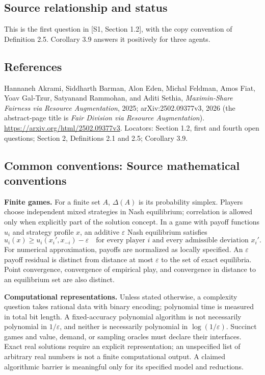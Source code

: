 \documentclass[11pt,a4paper]{article}
\begin{document}
\subsection*{Source relationship and status}
This is the first question in [S1, Section 1.2], with the copy convention
of Definition 2.5. Corollary 3.9 answers it positively for three agents.

\subsection*{References}
\begingroup\footnotesize\raggedright
\noindent[S1] Hannaneh Akrami, Siddharth Barman, Alon Eden,
Michal Feldman, Amos Fiat, Yoav Gal-Tzur, Satyanand Rammohan, and
Aditi Sethia,
\emph{Maximin-Share Fairness via Resource Augmentation},
2025; arXiv:2502.09377v3, 2026
(the abstract-page title is \emph{Fair Division via Resource Augmentation}).
\url{https://arxiv.org/html/2502.09377v3}.
Locators: Section 1.2, first and fourth open questions;
Section 2, Definitions 2.1 and 2.5; Corollary 3.9.
\par\endgroup

\subsection*{Common conventions: Source mathematical conventions}

\textbf{Finite games.} For a finite set $A$, $\Delta(A)$ is its probability
simplex. Players choose independent mixed strategies in Nash equilibrium;
correlation is allowed only when explicitly part of the solution concept.
In a game with payoff functions $u_i$ and strategy profile $x$, an additive
$\varepsilon$ Nash equilibrium satisfies
\[
 u_i(x)\geq u_i(x_i',x_{-i})-\varepsilon
 \quad\text{for every player $i$ and every admissible deviation $x_i'$}.
\]
For numerical approximation, payoffs are normalized as locally specified.
An $\varepsilon$ payoff residual is distinct from distance at most
$\varepsilon$ to the set of exact equilibria. Point convergence, convergence
of empirical play, and convergence in distance to an equilibrium set are
also distinct.

\textbf{Computational representations.} Unless stated otherwise, a complexity
question takes rational data with binary encoding; polynomial time is measured
in total bit length. A fixed-accuracy polynomial algorithm is not necessarily
polynomial in $1/\varepsilon$, and neither is necessarily polynomial in
$\log(1/\varepsilon)$. Succinct games and value, demand, or sampling oracles
must declare their interfaces. Exact real solutions require an explicit
representation; an unspecified list of arbitrary real numbers is not a
finite computational output. A claimed algorithmic barrier is meaningful
only for its specified model and reductions.
\end{document}
